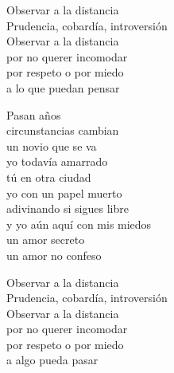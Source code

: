 \begin{lyrics}
Observar a la distancia\\
Prudencia, cobardía, introversión\\
Observar a la distancia\\
por no querer incomodar\\
por respeto o por miedo\\
a lo que puedan pensar

Pasan años\\
circunstancias cambian\\
un novio que se va\\
yo todavía amarrado\\
tú en otra ciudad\\
yo con un papel muerto\\
adivinando si sigues libre\\
y yo aún aquí con mis miedos\\
un amor secreto\\
un amor no confeso

Observar a la distancia\\
Prudencia, cobardía, introversión\\
Observar a la distancia\\
por no querer incomodar\\
por respeto o por miedo\\
a algo pueda pasar
\end{lyrics}

